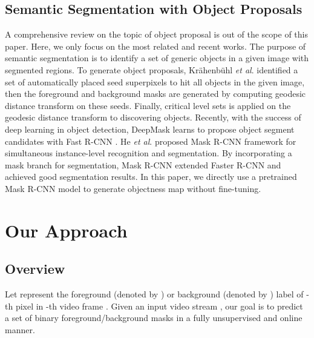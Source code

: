 \documentclass[journal]{IEEEtran}
\newcommand{\etal}{\textit{et al}. }
\begin{document}
\subsection{Semantic Segmentation with Object Proposals}
A comprehensive review on the topic of object proposal is out of the scope of this paper. Here, we only focus on the most related and recent works. The purpose of semantic segmentation \cite{ICCV2017_He,ECCV2014_Philipp,NIPS2015_Pinheiro} is to identify a set of generic objects in a given image with segmented regions. To generate object proposals, Kr{\"a}henb{\"u}hl \etal \cite{ECCV2014_Philipp} identified a set of automatically placed seed superpixels to hit all objects in the given image, then the foreground and background masks are generated by computing geodesic distance transform on these seeds. Finally, critical level sets is applied on the geodesic distance transform to discovering objects.
Recently, with the success of deep learning in object detection, 
DeepMask \cite{NIPS2015_Pinheiro} learns to propose object segment candidates with Fast R-CNN \cite{ICCV2015_Ross}.
He \etal \cite{ICCV2017_He} proposed Mask R-CNN framework for simultaneous instance-level recognition and segmentation.
By incorporating a mask branch for segmentation, Mask R-CNN extended Faster R-CNN \cite{NIPS2015_Ren} and achieved good segmentation results.
In this paper, we directly use a pretrained Mask R-CNN model to generate objectness map without fine-tuning.
 \section{Our Approach}
\label{sec:proposed}

\subsection{Overview}
Let {\small } represent the foreground (denoted by ) or background (denoted by ) label of -th pixel {\small } in -th video frame {\small }.
Given an input video stream {\small }, 
our goal is to predict a set of binary foreground/background masks {\small } in a fully unsupervised and online manner.
\end{document}
